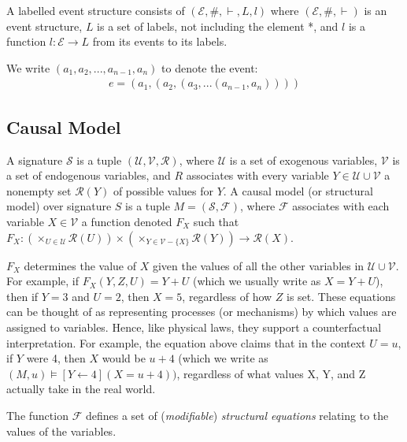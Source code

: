 \documentclass{article}
\begin{document}
\begin{definition}
    A labelled event structure consists of $(\mathcal{E},\#,\vdash,L,l)$ where
    $(\mathcal{E},\#,\vdash)$ is an event structure, $L$ is a set of labels,
    not including the element *, and $l$ is a function $l: \mathcal{E} \rightarrow L$
    from its events to its labels.
\end{definition}
\begin{notion}
    We write $(a_1,a_2,...,a_{n-1},a_n)$ to denote the event:
    \begin{align*}
        e = (a_1,(a_2,(a_3,...(a_{n-1},a_n))))
    \end{align*}
\end{notion}

\subsection{Causal Model}

A signature $\mathcal{S}$ is a tuple $(\mathcal{U},\mathcal{V},\mathcal{R})$,
where $\mathcal{U}$ is a set of exogenous variables, $\mathcal{V}$
is a set of endogenous variables, and $R$ associates with every variable
$Y\in \mathcal{U}\cup \mathcal{V}$ a nonempty set $\mathcal{R}(Y)$ of possible values for $Y$.
A causal model (or structural model) over signature $S$ is a tuple
$M=(\mathcal{S},\mathcal{F})$, where $\mathcal{F}$ associates with
each variable $X \in \mathcal{V}$ a function denoted $F_X$ such that
$F_X: (\times_{U\in \mathcal{U}}\mathcal{R}(U))\times (\times_{Y\in\mathcal{V}-\{X\}}\mathcal{R}(Y))\rightarrow \mathcal{R}(X)$.

$F_X$ determines the value of $X$ given the values of all the other variables
in $\mathcal{U}\cup \mathcal{V}$.
For example, if $F_X(Y,Z,U)=Y+U$ (which we usually write as $X = Y + U$),
then if $Y=3$ and $U=2$, then $X = 5$, regardless of how $Z$ is set.
These equations can be thought of as representing processes (or mechanisms) by which values are assigned to variables. Hence, like physical laws, they support a counterfactual interpretation.
For example, the equation above claims that in the context $U=u$, if $Y$ were 4, then $X$ would be $u+4$ (which we write as $(M,u) \models [Y\leftarrow 4](X = u + 4))$, regardless of what values X, Y, and Z actually take in the real world.


The function $\mathcal{F}$ defines a set of (\textit{modifiable}) \textit{structural equations} relating to the values of the variables.
\end{document}
